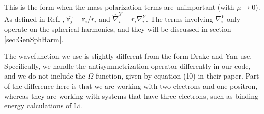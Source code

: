 \documentclass[Dissertation.tex]{subfiles}
\begin{document}
\noindent This is the form when the mass polarization terms are unimportant
(with $\mu \rightarrow 0$). As defined in Ref. \cite{Yan1997},
$\hat{\boldsymbol{r}_j} = \boldsymbol{r}_i/r_i$ and $\hat{\nabla}_i^Y = r_i \nabla_i^Y$.
The terms involving $\nabla_i^Y$ only operate on the spherical 
harmonics, and they will be discussed in section \ref{sec:GenSphHarm}.

The wavefunction we use is slightly different from the form Drake and Yan 
use. Specifically, we handle the antisymmetrization operator differently in 
our code, and we do not include the $\Omega$ function, given by equation (10) 
in their paper. Part of the difference here is that we are working with two 
electrons and one positron, whereas they are working with systems that have 
three electrons, such as binding energy calculations of Li.
\end{document}
